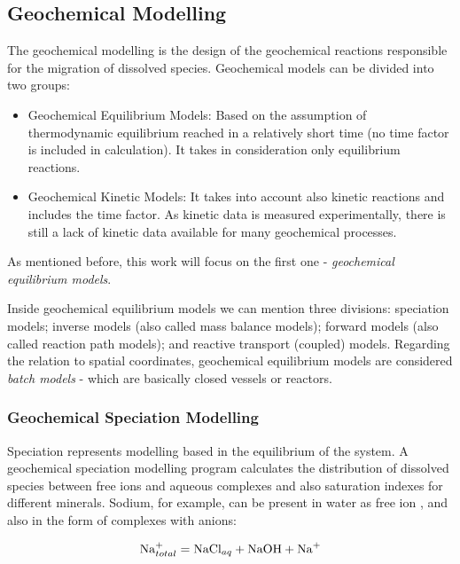 \documentclass[ppgc,mestrado,english]{iiufrgs}
\begin{document}
\subsection{Geochemical Modelling}
The geochemical modelling is the design of the geochemical reactions responsible for the migration of dissolved species. Geochemical models can be divided into two groups:
\begin{itemize}
\item Geochemical Equilibrium Models: Based on the assumption of thermodynamic equilibrium reached in a relatively short time (no time factor is included in calculation). It takes in consideration only equilibrium reactions.
\item Geochemical Kinetic Models: It takes into account also kinetic reactions and includes the time factor. As kinetic data is measured experimentally, there is still a lack of kinetic data available for many geochemical processes. 
\end{itemize}

As mentioned before, this work will focus on the first one - \emph{geochemical equilibrium models}.

Inside geochemical equilibrium models we can mention three divisions: speciation models; inverse models (also called mass balance models); forward models (also called reaction path models); and reactive transport (coupled) models. Regarding the relation to spatial coordinates, geochemical equilibrium models are considered \emph{batch models} - which are basically closed vessels or reactors.

\subsubsection{Geochemical Speciation Modelling}
Speciation represents modelling based in the equilibrium of the system. A geochemical speciation modelling program calculates the distribution of dissolved species between free ions and aqueous complexes and also saturation indexes for different minerals. Sodium, for example, can be present in water as free ion , and also in the form of complexes with anions:

\begin{equation}
\ce{Na^+}_{total} = \ce{NaCl}_{aq} + \ce{NaOH} + \ce{Na^+}
\end{equation}
\end{document}
